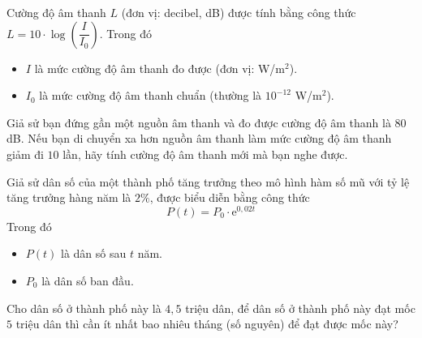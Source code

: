 \begin{bt}%
	Cường độ âm thanh $L$ (đơn vị: decibel, dB) được tính bằng công thức \break $L=10\cdot\log\left(\dfrac{I}{I_0}\right)$.	Trong đó
	\begin{itemize}
		\item $I$ là mức cường độ âm thanh đo được (đơn vị: W/m$^2$).
		\item $I_0$ là mức cường độ âm thanh chuẩn (thường là $10^{-12}$ W/m$^2$).
	\end{itemize}
	Giả sử bạn đứng gần một nguồn âm thanh và đo được cường độ âm thanh là $80$ dB. Nếu bạn di chuyển xa hơn nguồn âm thanh làm mức cường độ âm thanh giảm đi $10$ lần, hãy tính cường độ âm thanh mới mà bạn nghe được.
\end{bt}

\begin{bt}%
	Giả sử dân số của một thành phố tăng trưởng theo mô hình hàm số mũ với tỷ lệ tăng trưởng hàng năm là $2\%$, được biểu diễn bằng công thức
	$$P(t)=P_0\cdot \mathrm{e}^{0{,}02t}$$
	Trong đó
	\begin{itemize}
		\item $P(t)$ là dân số sau $t$ năm.
		\item $P_0$ là dân số ban đầu.
	\end{itemize}
	Cho dân số ở thành phố này là $4{,}5$ triệu dân, để dân số ở thành phố này đạt mốc $5$ triệu dân thì cần ít nhất bao nhiêu tháng (số nguyên) để đạt được mốc này?
\end{bt}

